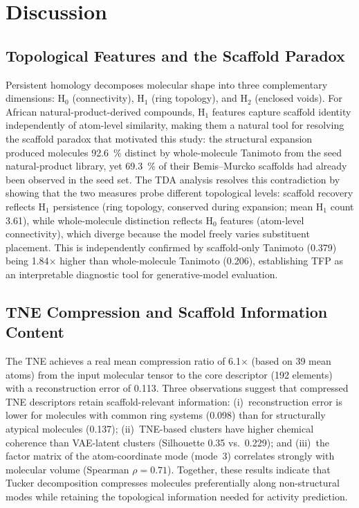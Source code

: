 \documentclass[11pt,a4paper]{article}
\begin{document}

\section{Discussion}

\subsection{Topological Features and the Scaffold Paradox}

Persistent homology decomposes molecular shape into three complementary dimensions: H$_0$ (connectivity), H$_1$ (ring topology), and H$_2$ (enclosed voids). For African natural-product-derived compounds, H$_1$ features capture scaffold identity independently of atom-level similarity, making them a natural tool for resolving the scaffold paradox that motivated this study: the structural expansion produced molecules \qty{92.6}{\percent} distinct by whole-molecule Tanimoto from the seed natural-product library, yet \qty{69.3}{\percent} of their Bemis--Murcko scaffolds had already been observed in the seed set. The TDA analysis resolves this contradiction by showing that the two measures probe different topological levels: scaffold recovery reflects H$_1$ persistence (ring topology, conserved during expansion; mean H$_1$ count \num{3.61}), while whole-molecule distinction reflects H$_0$ features (atom-level connectivity), which diverge because the model freely varies substituent placement. This is independently confirmed by scaffold-only Tanimoto (\num{0.379}) being \num{1.84}$\times$ higher than whole-molecule Tanimoto (\num{0.206}), establishing TFP as an interpretable diagnostic tool for generative-model evaluation.

\subsection{TNE Compression and Scaffold Information Content}

The TNE achieves a real mean compression ratio of \num{6.1}$\times$ (based on \num{39} mean atoms) from the input molecular tensor to the core descriptor (\num{192} elements) with a reconstruction error of \num{0.113}. Three observations suggest that compressed TNE descriptors retain scaffold-relevant information: (i)~reconstruction error is lower for molecules with common ring systems (\num{0.098}) than for structurally atypical molecules (\num{0.137}); (ii)~TNE-based clusters have higher chemical coherence than VAE-latent clusters (Silhouette \num{0.35} vs.\ \num{0.229}); and (iii)~the factor matrix of the atom-coordinate mode (mode~3) correlates strongly with molecular volume (Spearman $\rho = \num{0.71}$). Together, these results indicate that Tucker decomposition compresses molecules preferentially along non-structural modes while retaining the topological information needed for activity prediction.
\end{document}

